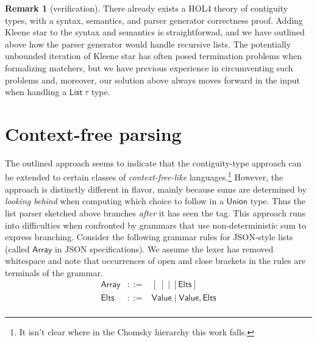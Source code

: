 \documentclass{article}
\newcommand{\konst}[1]{\ensuremath{\mathsf{#1}}}
\theoremstyle{definition}
\newtheorem*{remark}{Remark}
\begin{document}
\begin{remark} [verification] There already exists a
  HOL4 theory of contiguity types, with a syntax, semantics, and
  parser generator correctness proof. Adding Kleene star to the syntax
  and semantics is straightforwad, and we have outlined above how the
  parser generator would handle recursive lists. The potentially
  unbounded iteration of Kleene star has often posed termination
  problems when formalizing matchers, but we have previous
  experience in circumventing such problems and, moreover, our solution
  above always moves forward in the input when handling a
  $\konst{List}\;\tau$ type.
\end{remark}



\section{Context-free parsing}

The outlined approach seems to indicate that the contiguity-type
approach can be extended to certain classes of
\emph{context-free-like} languages.\footnote{It isn't clear where in
  the Chomsky hierarchy this work falls.} However, the approach is
distinctly different in flavor, mainly because sums are determined by
\emph{looking behind} when computing which choice to follow in a
\konst{Union} type. Thus the list parser sketched above branches
\emph{after} it has seen the tag. This approach runs into difficulties
when confronted by grammars that use non-deterministic sum to express
branching. Consider the following grammar rules for JSON-style lists
(called \konst{Array} in JSON specifications). We assume the lexer has
removed whitespace and note that occurrences of open and close
brackets in the rules are terminals of the grammar.
\[
\begin{array}{rcl}
 \konst{Array} & ::= & [\; ] \mid [ \konst{Elts} ] \\
 \konst{Elts}  & ::= & \konst{Value} \mid \konst{Value} ,  \konst{Elts} \\
\end{array}
\]
\end{document}
